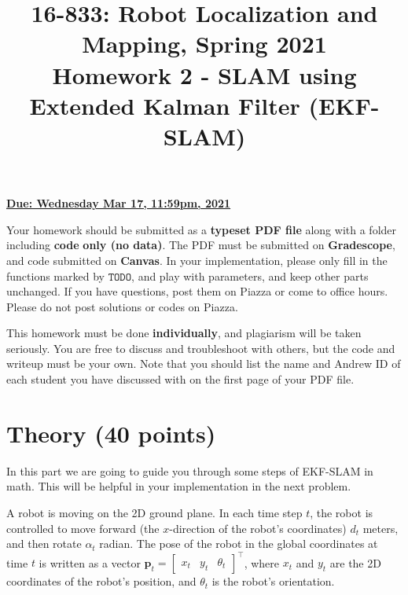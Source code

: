 \documentclass[12pt, a4paper]{article}
\date{}
\begin{document}
\title{\Large 16-833: Robot Localization and Mapping, Spring 2021\\
\textbf{Homework 2 - SLAM using Extended Kalman Filter (EKF-SLAM)}}
\maketitle
\begin{flushright}
\textbf{\uline{Due: Wednesday Mar 17, 11:59pm, 2021}}
\par\end{flushright}


Your homework should be submitted as a\textbf{ typeset PDF file} along
with a\textbf{ }folder\textbf{ }including\textbf{ code} \textbf{only
(no data)}. The PDF must be submitted on \textbf{Gradescope}, and
code submitted on \textbf{Canvas}. In your implementation, please
only fill in the functions marked by $\mathtt{TODO}$, and play with parameters, and keep other parts unchanged. If you have questions, post them on Piazza or come to office
hours. Please do not post solutions or codes on Piazza. 

This homework must be done \textbf{individually}, and plagiarism will
be taken seriously. You are free to discuss and troubleshoot with
others, but the code and writeup must be your own. Note that you should
list the name and Andrew ID of each student you have discussed with
on the first page of your PDF file.

\section{Theory (40 points)}

In this part we are going to guide you through some steps of EKF-SLAM
in math. This will be helpful in your implementation in the next problem. 

A robot is moving on the 2D ground plane. In each time step $t$,
the robot is controlled to move forward (the $x$-direction of the
robot's coordinates) $d_{t}$ meters, and then rotate $\alpha_{t}$
radian. The pose of the robot in the global coordinates at time $t$
is written as a vector $\mathbf{p}_{t}=\left[\begin{array}{ccc}
x_{t} & y_{t} & \theta_{t}\end{array}\right]^{\top}$, where $x_{t}$ and $y_{t}$ are the 2D coordinates of the robot's
position, and $\theta_{t}$ is the robot's orientation.
\end{document}
